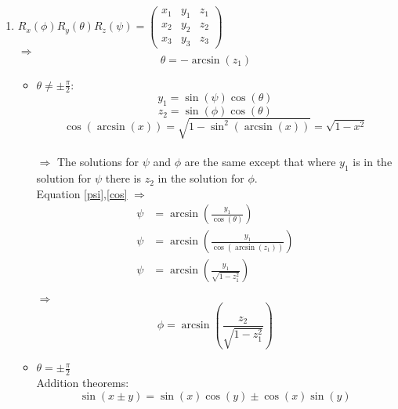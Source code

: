 \documentclass{scrartcl}
\begin{document}
\begin{enumerate}[label={b)}]
	\item
	$R_x(\phi)R_y(\theta)R_z(\psi)=\begin{pmatrix}
		x_1 & y_1 & z_1\\
		x_2 & y_2 & z_2\\
		x_3 & y_3 & z_3
	\end{pmatrix}$
	\\$\Rightarrow$ 
	\begin{equation}
		\theta=-\arcsin(z_1)
		\label{theta}
	\end{equation}
	\begin{itemize}
	\item  $\theta\neq\pm \frac{\pi}{2}$:
	\begin{equation}
		y_1=\sin(\psi)\cos(\theta)
		\label{psi}
	\end{equation}
	\begin{equation}
		z_2=\sin(\phi)\cos(\theta)
		\label{phi}
	\end{equation} 
	\begin{equation}
	\cos(\arcsin(x))=\sqrt{1-\sin^2(\arcsin(x))}=\sqrt{1-x^2}
	\label{cos}
	\end{equation}
	\\$\Rightarrow$ The solutions for $\psi$ and $\phi$ are the same except that where $y_1$ is in the solution for $\psi$ there is $z_2$ in the solution for $\phi$.
	\\Equation \ref{psi},\ref{cos}
	$\Rightarrow$ 
	\begin{align}
		\psi &=\arcsin\left( \frac{y_1}{\cos(\theta)}\right) \nonumber\\
		\psi &=\arcsin\left( \frac{y_1}{\cos(\arcsin(z_1))}\right) \nonumber\\
		\psi &=\arcsin\left( \frac{y_1}{\sqrt{1-z_1^2}}\right) 
	\end{align}

	$\Rightarrow$
	 \begin{equation}
		\phi=\arcsin\left( \frac{z_2}{\sqrt{1-z_1^2}}\right)
	\end{equation}
	
	
	\item $\theta=\pm \frac{\pi}{2}$
	\\Addition theorems:
	\begin{equation}
	\sin(x\pm y)=\sin(x)\cos(y)\pm \cos(x)\sin(y)
	\label{addSin}
	\end{equation}
	

\end{itemize}
\end{enumerate}
\end{document}
